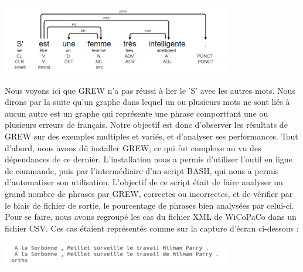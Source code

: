 \documentclass[11pt]{article}
\begin{document}
\begin{center}
\includegraphics[width=10cm]{imgGrew.png} %
\end{center}

Nous voyons ici que GREW n'a pas r\'{e}ussi \`{a} lier le 'S' avec les autres mots. Nous dirons par la suite qu'un graphe dans lequel un ou plusieurs mots ne sont li\'{e}s \`{a} aucun autre est un graphe qui repr\'{e}sente une phrase comporttant une ou plusieurs erreurs de fran\c{c}ais. Notre objectif est donc d'observer  les r\'{e}sultats de GREW sur des exemples multiples et vari\'{e}s, et d'analyser ses performances.
\newline
\newline
Tout d'abord, nous avons d\^{u} installer GREW, ce qui fut complexe au vu des d\'{e}pendances de ce dernier. L'installation nous a permis d'utiliser l'outil en ligne de commande, puis par l'interm\'{e}diaire d'un script BASH, qui nous a permis d'automatiser son utilisation. L'objectif de ce script \'{e}tait de faire analyser un grand nombre de phrases par GREW, correctes ou incorrectes, et de v\'{e}rifier par le biais de fichier de sortie, le pourcentage de phrases bien analys\'{e}es par celui-ci. Pour se faire, nous avons regroup\'{e} les cas du fichier XML de WiCoPaCo dans un fichier CSV. Ces cas \'{e}taient repr\'{e}sent\'{e}s comme sur la capture d'\'{e}cran ci-dessous :

\begin{center}
\includegraphics[width=10cm]{exemple1.png} %
\end{center}
\end{document}
